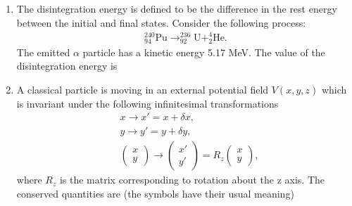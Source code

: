 \documentclass[14pt, a4paper]{extarticle}
\begin{document}
\begin{enumerate}[label=\textbf{Q. \arabic*}, start=21]
\item The disintegration energy is defined to be the difference in the rest energy between the initial and final states.
Consider the following process:
\begin{align*} ^{240}_{94}\text{Pu} \rightarrow ^{236}_{92}\text{U} + ^{4}_{2}\text{He}. \end{align*}
The emitted $\alpha$ particle has a kinetic energy 5.17 MeV. The value of the disintegration energy is
\begin{enumerate}[label=(\Alph*)]
\end{enumerate}

\item A classical particle is moving in an external potential field $V(x,y,z)$ which is invariant under the following infinitesimal transformations
\begin{align*}
& x \rightarrow x' = x + \delta x, \\
& y \rightarrow y' = y + \delta y, \\
& \begin{pmatrix} x \\ y \end{pmatrix} \rightarrow \begin{pmatrix} x' \\ y' \end{pmatrix} = R_z \begin{pmatrix} x \\ y \end{pmatrix},
\end{align*}
where $R_z$ is the matrix corresponding to rotation about the z axis.
The conserved quantities are (the symbols have their usual meaning)
\begin{enumerate}[label=(\Alph*)]
\end{enumerate}


\end{enumerate}
\end{document}
